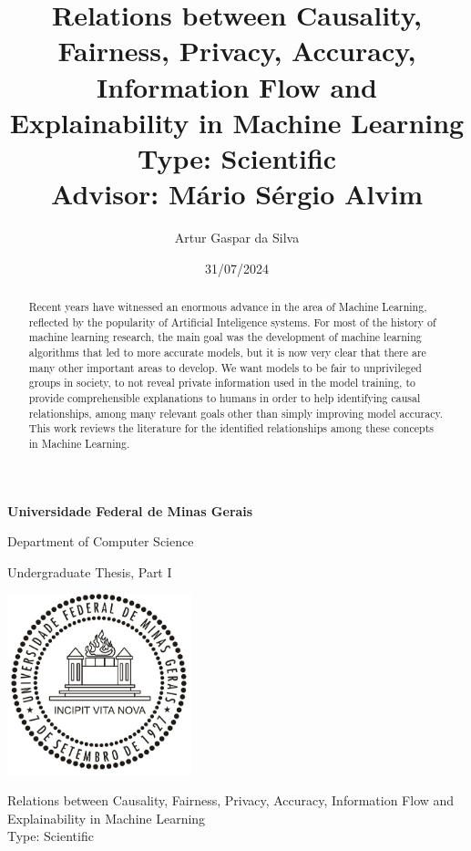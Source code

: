 \documentclass[conference]{IEEEtran}
\title{Relations between Causality, Fairness, Privacy, Accuracy, Information Flow and Explainability in Machine Learning\large\\ Type: Scientific\\Advisor: Mário Sérgio Alvim}
\author{Artur Gaspar da Silva}
\date{31/07/2024}
\begin{document}
\begin{titlepage}
    \begin{center}

        \Huge
        \textbf{Universidade Federal de Minas Gerais}

        \vspace{0.5cm}
        \LARGE
            Department of Computer Science

        \vspace{0.5cm}
        \large
           Undergraduate Thesis, Part I 

        \vspace{0.7cm}

        \includegraphics[width=0.4\textwidth]{logoUFMG.jpg}



        \vspace{0.5cm}

        \Huge
            Relations between Causality, Fairness, Privacy, Accuracy, Information Flow and Explainability in Machine Learning
            \\\large Type: Scientific

        \vspace{0.5cm}
        \begin{abstract}
            Recent years have witnessed an enormous advance in the area of Machine Learning, reflected by the popularity of Artificial Inteligence systems. For most of the history of machine learning research, the main goal was the development of machine learning algorithms that led to more accurate models, but it is now very clear that there are many other important areas to develop. We want models to be fair to unprivileged groups in society, to not reveal private information used in the model training, to provide comprehensible explanations to humans in order to help identifying causal relationships, among many relevant goals other than simply improving model accuracy. This work reviews the literature for the identified relationships among these concepts in Machine Learning.
        \end{abstract}


\end{center}
\end{titlepage}
\end{document}
